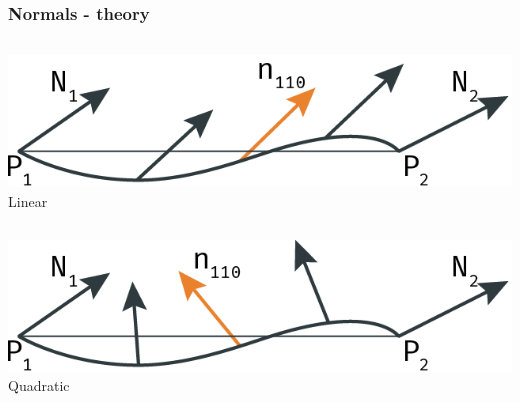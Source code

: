 	\begin{frame}\frametitle{Normals - theory}
		\begin{columns}
			\begin{column}{0.6\textwidth}
				\begin{center}
					\includegraphics[width=\textwidth]{img/1_single/linearVsQuadraticNormals_linear.png}
					\small{Linear}
				\end{center}	
			\end{column}
		\end{columns}
		\pause
		\vspace{0.8cm}
		\begin{columns}
			\begin{column}{0.6\textwidth}
				\begin{center}
					\includegraphics[width=\textwidth]{img/1_single/linearVsQuadraticNormals_quadratic.png}
					\small{Quadratic}
				\end{center}	
			\end{column}
		\end{columns}
	\end{frame}

